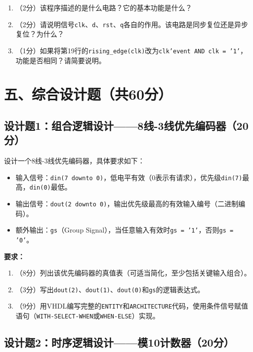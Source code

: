 \begin{enumerate}[label=(\arabic*)]
  \item （2分）该程序描述的是什么电路？它的基本功能是什么？
  \item （2分）请说明信号\texttt{clk}、\texttt{d}、\texttt{rst}、\texttt{q}各自的作用。该电路是同步复位还是异步复位？为什么？
  \item （1分）如果将第19行的\texttt{rising\_edge(clk)}改为\texttt{clk'event AND clk = '1'}，功能是否相同？请简要说明。
\end{enumerate}

\newpage

\section*{五、综合设计题（共60分）}

\subsection*{设计题1：组合逻辑设计——8线-3线优先编码器（20分）}

设计一个8线-3线优先编码器，具体要求如下：

\begin{itemize}
  \item 输入信号：\texttt{din(7~downto~0)}，低电平有效（0表示有请求），优先级\texttt{din(7)}最高，\texttt{din(0)}最低。
  \item 输出信号：\texttt{dout(2~downto~0)}，输出优先级最高的有效输入编号（二进制编码）。
  \item 额外输出：\texttt{gs}（Group Signal），当任意输入有效时\texttt{gs = '1'}，否则\texttt{gs = '0'}。
\end{itemize}

\medskip
\noindent\textbf{要求：}
\begin{enumerate}[label=(\arabic*)]
  \item （8分）列出该优先编码器的真值表（可适当简化，至少包括关键输入组合）。
  \item （3分）写出\texttt{dout(2)}、\texttt{dout(1)}、\texttt{dout(0)}和\texttt{gs}的逻辑表达式。
  \item （9分）用VHDL编写完整的\texttt{ENTITY}和\texttt{ARCHITECTURE}代码，使用条件信号赋值语句（\texttt{WITH-SELECT-WHEN}或\texttt{WHEN-ELSE}）实现。
\end{enumerate}

\subsection*{设计题2：时序逻辑设计——模10计数器（20分）}

